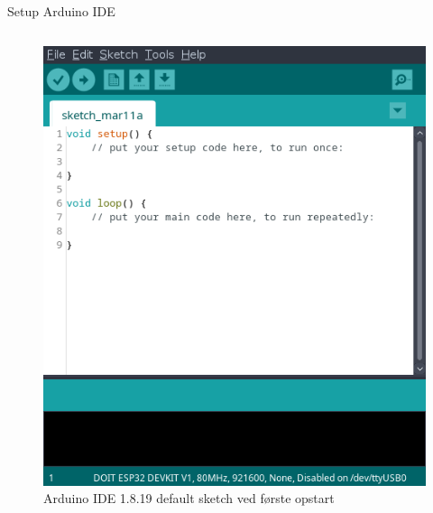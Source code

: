 \documentclass[aspectratio=169]{beamer}
\begin{document}
\begin{frame}{Setup Arduino IDE}
\begin{columns}
\begin{column}{0.5\textwidth}
\begin{figure}
  			\includegraphics[height=0.6\textheight,keepaspectratio=true]{assets/pictures/arduino-ide.png}
  			\caption{Arduino IDE 1.8.19 default sketch ved første opstart}
  			\label{fig:arduino-ide}
		\end{figure}
	\end{column}
\end{columns}
\end{frame}
\end{document}
